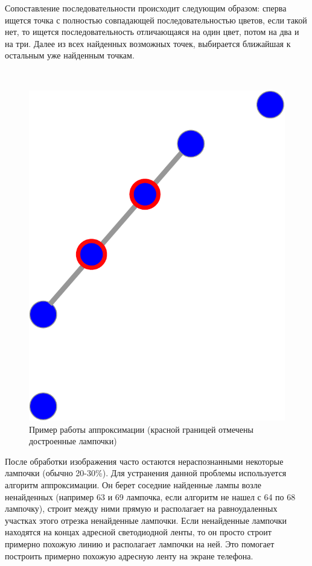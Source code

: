 Сопоставление последовательности происходит следующим образом: сперва ищется точка с полностью совпадающей последовательностью цветов, если такой нет, то ищется последовательность отличающаяся на один цвет, потом на два и на три. Далее из всех найденных возможных точек, выбирается ближайшая к остальным уже найденным точкам.


~
\begin{figure}[H]
\centering
	\includegraphics[scale=0.45]{figures/calibration/approximation.pdf}
	\caption{Пример работы аппроксимации (красной границей отмечены достроенные лампочки)}
	\label{fig:develop:algorithm:approximation}
\end{figure}

После обработки изображения часто остаются нераспознанными некоторые лампочки (обычно 20-30\%). Для устранения данной проблемы используется алгоритм аппроксимации. Он берет соседние найденные лампы возле ненайденных (например 63 и 69 лампочка, если алгоритм не нашел с 64 по 68 лампочку), строит между ними прямую и располагает на равноудаленных участках этого отрезка ненайденные лампочки. Если ненайденные лампочки находятся на концах адресной светодиодной ленты, то он просто строит примерно похожую линию и располагает лампочки на ней. Это помогает построить примерно похожую адресную ленту на экране телефона.
